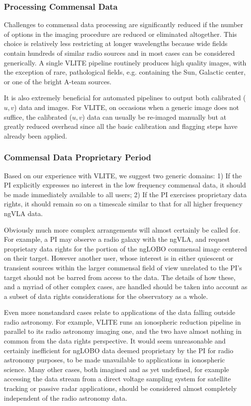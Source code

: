 \documentclass[11pt]{article}
\begin{document}
\subsubsection{Processing Commensal Data}

Challenges to commensal data processing are significantly reduced if the number of options in the imaging procedure are reduced or eliminated altogether. This choice is relatively less restricting at longer wavelengths because wide fields contain hundreds of similar radio sources and in most cases can be considered generically. A single VLITE pipeline routinely produces high quality images, with the exception of rare, pathological fields, e.g. containing the Sun, Galactic center, or one of the bright A-team sources. 

It is also extremely beneficial for automated pipelines to output both calibrated ($u,v$) data and images. For VLITE, on occasions when a generic image does not suffice, the calibrated ($u,v$) data can usually be re-imaged manually but at greatly reduced overhead since all the basic calibration and flagging steps have already been applied.

\subsubsection{Commensal Data Proprietary Period}

Based on our experience with VLITE, we suggest two generic domains: 1) If the PI explicitly expresses no interest in the low frequency commensal data, it should be made immediately available to all users; 2) If the PI exercises proprietary data rights, it should remain so on a timescale similar to that for all higher frequency ngVLA data. 

Obviously much more complex arrangements will almost certainly be called for. For example, a PI may observe a radio galaxy with the ngVLA, and request proprietary data rights for the portion of the ngLOBO commensal image centered on their target. However another user, whose interest is in either quiescent or transient sources within the larger commensal field of view unrelated to the PI's target should not be barred from access to the data. The details of how these, and a myriad of other complex cases, are handled should be taken into account as a subset of data rights considerations for the observatory as a whole.

Even more nonstandard cases relate to applications of the data falling outside radio astronomy. For example, VLITE runs an ionospheric reduction pipeline in parallel to its radio astronomy imaging one, and the two have almost nothing in common from the data rights perspective. It would seem unreasonable and certainly inefficient for ngLOBO data deemed proprietary by the PI for radio astronomy purposes, to be made unavailable to applications in ionospheric science. Many other cases, both imagined and as yet undefined, for example accessing the data stream from a direct voltage sampling system for satellite tracking or passive radar applications, should be considered almost completely independent of the radio astronomy data.
\end{document}
